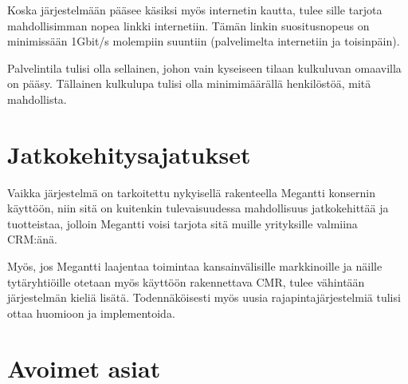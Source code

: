         Koska järjestelmään pääsee käsiksi myös internetin kautta, tulee sille tarjota mahdollisimman nopea linkki internetiin. Tämän linkin suositusnopeus on minimissään 1Gbit/s molempiin suuntiin (palvelimelta internetiin ja toisinpäin). 

        Palvelintila tulisi olla sellainen, johon vain kyseiseen tilaan kulkuluvan omaavilla on pääsy. Tällainen kulkulupa tulisi olla minimimäärällä henkilöstöä, mitä mahdollista. 


\section{Jatkokehitysajatukset}     %

    Vaikka järjestelmä on tarkoitettu nykyisellä rakenteella Megantti konsernin käyttöön, niin sitä on kuitenkin tulevaisuudessa
    mahdollisuus jatkokehittää ja tuotteistaa, jolloin Megantti voisi tarjota sitä muille yrityksille valmiina CRM:änä.

    Myös, jos Megantti laajentaa toimintaa kansainvälisille markkinoille ja näille tytäryhtiöille otetaan myös käyttöön rakennettava
    CMR, tulee vähintään järjestelmän kieliä lisätä. Todennäköisesti myös uusia rajapintajärjestelmiä tulisi ottaa huomioon ja implementoida.


\section{Avoimet asiat}     %



   
